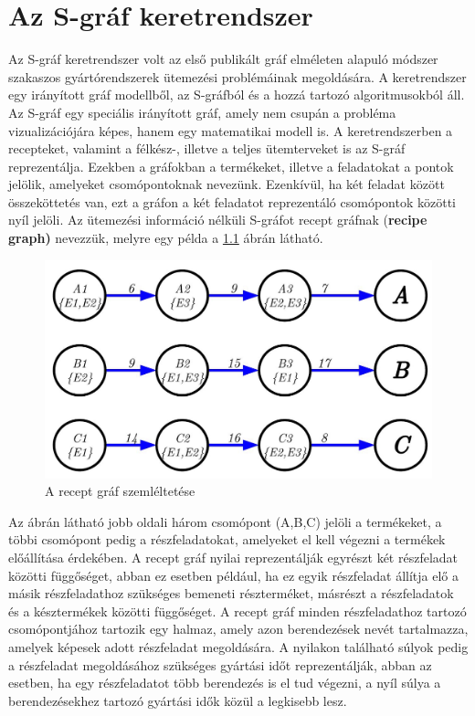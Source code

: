 \chapter{Az S-gráf keretrendszer} \label{S-graph}
Az S-gráf keretrendszer volt az első publikált gráf elméleten alapuló módszer szakaszos gyártórendszerek ütemezési problémáinak megoldására. \cite{Sanmarti2002}
A keretrendszer egy irányított gráf modellből, az S-gráfból és a hozzá tartozó algoritmusokból áll. \cite{SANMARTI1998S847}
Az S-gráf egy speciális irányított gráf, amely nem csupán a probléma vizualizációjára képes, hanem egy matematikai modell is.
A keretrendszerben a recepteket, valamint a félkész-, illetve a teljes ütemterveket is az S-gráf reprezentálja.
Ezekben a gráfokban a termékeket, illetve a feladatokat a pontok jelölik, amelyeket csomópontoknak nevezünk.
Ezenkívül, ha két feladat között összeköttetés van, ezt a gráfon a két feladatot reprezentáló csomópontok közötti nyíl jelöli.
Az ütemezési információ nélküli S-gráfot recept gráfnak (\textbf{recipe graph)} nevezzük, melyre egy példa a \ref{recipeGraph} ábrán látható.
\begin{figure}[H]
\begin{center}
\includegraphics[scale=0.35]{recipeGraph}
\caption{A recept gráf szemléltetése}
\label{recipeGraph}
\end{center}
\end{figure}
Az ábrán látható jobb oldali három csomópont (A,B,C) jelöli a termékeket, a többi csomópont pedig a részfeladatokat, amelyeket el kell végezni a termékek előállítása érdekében.
A recept gráf nyilai reprezentálják egyrészt két részfeladat közötti függőséget, abban ez esetben például, ha ez egyik részfeladat állítja elő a másik részfeladathoz szükséges bemeneti részterméket, másrészt a részfeladatok és a késztermékek közötti függőséget.
A recept gráf minden részfeladathoz tartozó csomópontjához tartozik egy halmaz, amely azon berendezések nevét tartalmazza, amelyek képesek adott részfeladat megoldására.
A nyilakon található súlyok pedig a részfeladat megoldásához szükséges gyártási időt reprezentálják, abban az esetben, ha egy részfeladatot több berendezés is el tud végezni, a nyíl súlya a berendezésekhez tartozó gyártási idők közül a legkisebb lesz.

